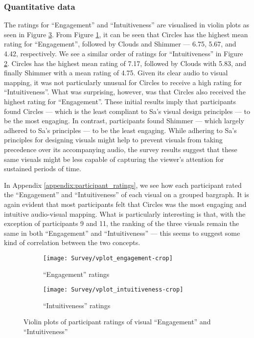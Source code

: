 \documentclass[../initial_thesis.tex]{subfiles}
\begin{document}
\subsubsection{Quantitative data}
The ratings for ``Engagement'' and ``Intuitiveness'' are visualised in violin plots as seen in Figure \ref{fig:vplot_ratings}. From Figure \ref{fig:engagement_ratings}, it can be seen that Circles has the highest mean rating for ``Engagement'', followed by Clouds and Shimmer --- 6.75, 5.67, and 4.42, respectively. We see a similar order of ratings for ``Intuitiveness'' in Figure \ref{fig:intuitive_ratings}. Circles has the highest mean rating of 7.17, followed by Clouds with 5.83, and finally Shimmer with a mean rating of 4.75. Given its clear audio to visual mapping, it was not particularly unusual for Circles to receive a high rating for ``Intuitiveness''. What was surprising, however, was that Circles also received the highest rating for ``Engagement''. These initial results imply that participants found Circles --- which is the least compliant to Sa's visual design principles --- to be the most engaging. In contrast, participants found Shimmer --- which largely adhered to Sa's principles --- to be the least engaging. While adhering to Sa's principles for designing visuals might help to prevent visuals from taking precedence over its accompanying audio, the survey results suggest that these same visuals might be less capable of capturing the viewer's attention for sustained periods of time. \par

In Appendix \ref{appendix:participant_ratings}, we see how each participant rated the ``Engagement'' and ``Intuitiveness'' of each visual on a grouped bargraph. It is again evident that most participants felt that Circles was the most engaging and intuitive audio-visual mapping. What is particularly interesting is that, with the exception of participants 9 and 11, the ranking of the three visuals remain the same in both ``Engagement'' and ``Intuitiveness'' --- this seems to suggest some kind of correlation between the two concepts.

\begin{figure}
  \begin{subfigure}{0.5\textwidth}
    \centering
    \texttt{[image: Survey/vplot\_engagement-crop]}
    \caption{``Engagement'' ratings}
    \label{fig:engagement_ratings}
  \end{subfigure}
  \begin{subfigure}{0.5\textwidth}
    \centering
    \texttt{[image: Survey/vplot\_intuitiveness-crop]}
    \caption{``Intuitiveness'' ratings}
    \label{fig:intuitive_ratings}
  \end{subfigure}
  \caption{Violin plots of participant ratings of visual ``Engagement'' and ``Intuitiveness''}
  \label{fig:vplot_ratings}
\end{figure}
\end{document}
